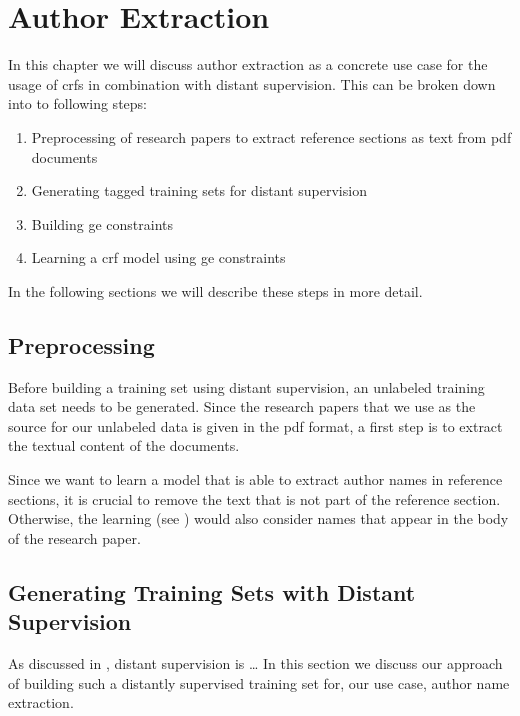 \chapter{Author Extraction}\label{cha:author-extraction}

In this chapter we will discuss author extraction as a concrete use case for the usage of \glspl{crf} in combination with \gls{distant supervision}.
This can be broken down into to following steps:
\begin{enumerate}
  \item Preprocessing of research papers to extract reference sections as text from \gls{pdf} documents
  \item Generating tagged training sets for distant supervision
  \item Building \acrfull{ge} constraints
  \item Learning a \gls{crf} model using \gls{ge} constraints
\end{enumerate}
In the following sections we will describe these steps in more detail.

\section{Preprocessing}\label{sec:ae-preprocessing}

Before building a training set using \gls{distant supervision}, an unlabeled training data set needs to be generated.
Since the research papers that we use as the source for our unlabeled data is given in the \gls{pdf} format, a first step is to extract the textual content of the documents.

Since we want to learn a model that is able to extract author names in reference sections, it is crucial to remove the text that is not part of the reference section.
Otherwise, the learning (see ) would also consider names that appear in the body of the research paper.

\section{Generating Training Sets with Distant Supervision}\label{sec:ae-distant-supervision}

As discussed in , distant supervision is \dots
In this section we discuss our approach of building such a distantly supervised training set for, our use case, author name extraction.




